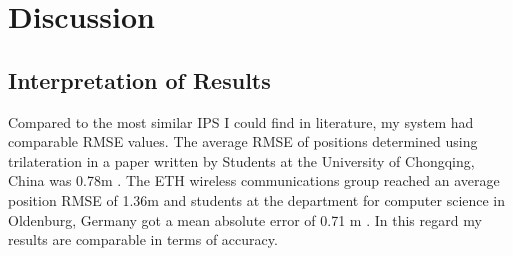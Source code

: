 \documentclass[a4paper, oneside]{ipsreport}
\begin{document}
\begin{table}[h]
	\centering
	\caption{Tabular overview of experimental results stemming from wrong MSE function}
	\label{table:2}
\end{table}


\chapter{Discussion}
\label{chapter:discussion}

\section{Interpretation of Results}
Compared to the most similar IPS I could find in literature, my system had comparable RMSE values. The average RMSE of positions determined using trilateration in a paper written by Students at the University of Chongqing, China was 0.78m \autocite{ImuTrilaterationFusion}. The ETH wireless communications group reached an average position RMSE of 1.36m \autocite{AntennaDiversity} and students at the department for computer science in Oldenburg, Germany got a mean absolute error of 0.71 m \autocite{BLE}. In this regard my results are comparable in terms of accuracy.
\end{document}
